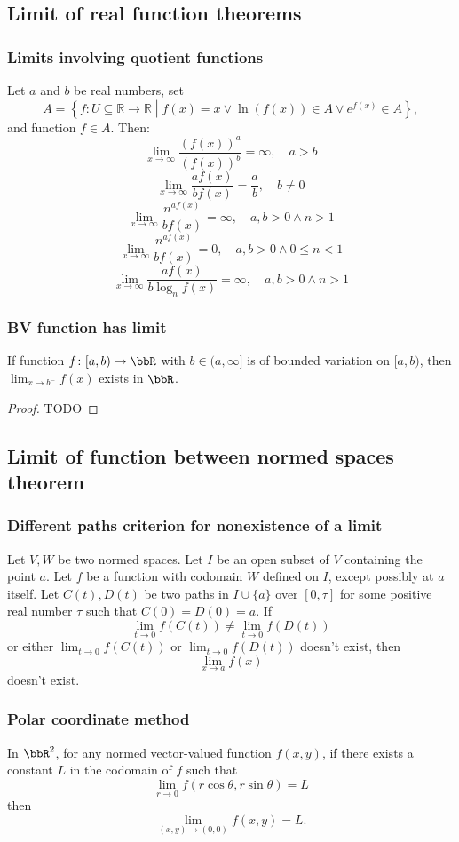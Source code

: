 \documentclass[a4paper,12pt]{report}
\begin{document}
\begin{itemize}
\begin{itemize}
\subsection{Limit of real function theorems}
\subsubsection{Limits involving quotient functions}
Let \( a \) and \( b \) be real numbers, set
\[A=\left\{f\colon U\subseteq\mathbb{R}\to\mathbb{R} \middle | f(x) = x \lor \ln(f(x)) \in A \lor e^{f\left(x\right)}  \in A \right\},\]
and function $f\in A$. Then:
\[\lim_{x \to \infty} \frac{\left(f\left(x\right)\right)^a}{\left(f\left(x\right)\right)^b} = \infty, \quad a > b \]
\[ \lim_{x \to \infty} \frac{af\left(x\right)}{bf\left(x\right)} = \frac{a}{b}, \quad b \neq 0 \]
\[ \lim_{x \to \infty}\frac{n^{af\left(x\right)}}{bf\left(x\right)} = \infty, \quad a,b > 0 \land  n > 1 \]
\[ \lim_{x \to \infty}\frac{n^{af\left(x\right)}}{bf\left(x\right)} = 0, \quad a,b > 0 \land  0\leq n<1 \]
\[ \lim_{x \to \infty}\frac{af\left(x\right)}{b\log_n f\left(x\right)} = \infty, \quad a,b > 0 \land  n > 1 \]
\subsubsection{BV function has limit}
If function $f\colon[a,b)\to\bbR$ with $b\in(a,\infty]$ is of bounded variation on $[a,b)$, then $\lim_{x\to b^-}f(x)$ exists in $\bbR$.
\begin{proof}
TODO
\end{proof}
\subsection{Limit of function between normed spaces theorem}
\subsubsection{Different paths criterion for nonexistence of a limit}
Let $V,W$ be two normed spaces. Let $I$ be an open subset of $V$ containing the point $a$. Let $f$ be a function with codomain $W$ defined on $I$, except possibly at $a$ itself. Let $C(t),D(t)$ be two paths in $I\cup\{a\}$ over $[0,\tau]$ for some positive real number $\tau$ such that $C(0)=D(0)=a$. If
\[\lim_{t\to 0}f(C(t))\neq\lim_{t\to 0}f(D(t))\]
or either $\lim_{t\to 0}f(C(t))$ or $\lim_{t\to 0}f(D(t))$ doesn't exist, then
\[\lim_{x\to a}f(x)\]
doesn't exist.
\subsubsection{Polar coordinate method}
In $\bbR^2$, for any normed vector-valued function $f(x,y)$, if there exists a constant $L$ in the codomain of $f$ such that
\[\lim_{r\to 0}f(r\cos\theta,r\sin\theta)=L\]
then
\[\lim_{(x,y)\to(0,0)}f(x,y)=L.\]

\end{itemize}
\end{itemize}
\end{document}
